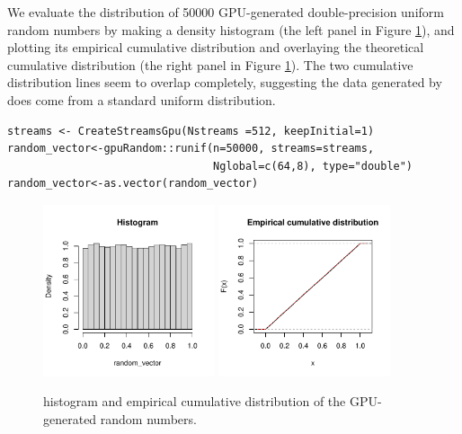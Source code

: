 \documentclass[article,nojss]{jss}\usepackage[]{graphicx}\usepackage[]{color}
\makeatletter
\newenvironment{kframe}{%
 \def\at@end@of@kframe{}%
 \ifinner\ifhmode%
  \def\at@end@of@kframe{\end{minipage}}%
  \begin{minipage}{\columnwidth}%
 \fi\fi%
 \def\FrameCommand##1{\hskip\@totalleftmargin \hskip-\fboxsep
 \colorbox{shadecolor}{##1}\hskip-\fboxsep
     \hskip-\linewidth \hskip-\@totalleftmargin \hskip\columnwidth}%
 \MakeFramed {\advance\hsize-\width
   \@totalleftmargin\z@ \linewidth\hsize
   \@setminipage}}%
 {\par\unskip\endMakeFramed%
 \at@end@of@kframe}
\newenvironment{knitrout}{}{} %
\newcommand{\fct}[1]{\code{#1()}}
\makeatother
\begin{document}
We evaluate the distribution of 50000 GPU-generated double-precision uniform random numbers by making a density histogram  (the left panel in Figure \ref{fig0}), and plotting its empirical cumulative distribution and overlaying the theoretical cumulative distribution (the right panel in Figure \ref{fig0}). The two cumulative distribution lines seem to overlap completely, suggesting the data generated by \fct{gpuRandom::runif} does come from a standard uniform distribution.
\begin{knitrout}
\color{fgcolor}\begin{kframe}
\begin{verbatim}
streams <- CreateStreamsGpu(Nstreams =512, keepInitial=1)
random_vector<-gpuRandom::runif(n=50000, streams=streams, 
                                Nglobal=c(64,8), type="double")
random_vector<-as.vector(random_vector)
\end{verbatim}
\end{kframe}
\end{knitrout}
\begin{figure}[H]
\centering
\begin{knitrout}
\color{fgcolor}
\includegraphics[width=0.45\textwidth]{figure/largenumberuniforms-1} 
\includegraphics[width=0.45\textwidth]{figure/largenumberuniforms-2} 
\end{knitrout}
\caption{histogram and empirical cumulative distribution of the GPU-generated random numbers.\label{fig0}}
\end{figure}
\end{document}
